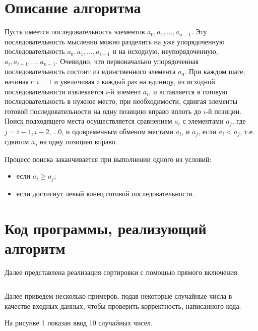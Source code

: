 \documentclass[bachelor, och, labwork]{shiza}
\begin{document}

\tableofcontents


\section{Описание алгоритма}

  Пусть имеется последовательность элементов $a_0, a_1, ..., a_{n-1}$. Эту последовательность мысленно можно
  разделить на уже упорядоченную последовательность $a_0, a_1, ..., a_{i-1}$ и на исходную, неупорядоченную,
  $a_i, a_{i+1}, ..., a_{n-1}$. Очевидно, что первоначально упорядоченная последовательность состоит из единственного
  элемента $a_0$. При каждом шаге, начиная с $i=1$ и увеличивая $i$ каждый раз на единицу, из исходной последовательности
  извлекается $i$-й элемент $a_i$, и вставляется в готовую последовательность в нужное место, при необходимости, сдвигая
  элементы готовой последовательности на одну позицию вправо вплоть до $i$-й позиции. Поиск подходящего места осуществляется
  сравнением $a_i$ с элементами $a_j$, где $j=i-1, i-2,...0$, и одовременным обменом местами $a_i$, и $a_j$, если $a_i < a_j$,
  т.е. сдвигом $a_j$ на одну позицию вправо. 
  
  Процесс поиска заканчивается при выполнении одного из условий:
  
  \begin{itemize}
    \item если $a_i \geq a_j$;
    \item если достигнут левый конец готовой последовательности.
  \end{itemize}

  \section{Код программы, реализующий алгоритм}

  Далее представлена реализация сортировки с помощью прямого включения.


  \inputminted[fontsize=\small]{C++}{code/sort.cpp}

  Далее приведем несколько примеров, подав некоторые случайные числа в качестве входных данных, чтобы проверить корректность, написанного
  кода.

  На рисунке 1 показан ввод 10 случайных чисел.
\end{document}

